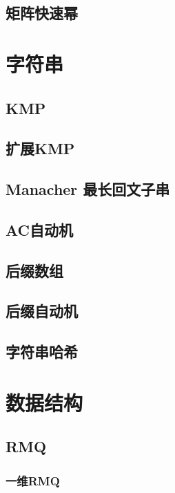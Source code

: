 \documentclass[twocolumn,a4]{article}%
\begin{document}
\subsection{矩阵快速幂}
    
    
\section{字符串}
\subsection{KMP}

\subsection{扩展KMP}

\subsection{Manacher 最长回文子串}

\subsection{AC自动机}

\subsection{后缀数组}

\subsection{后缀自动机}

\subsection{字符串哈希}

\section{数据结构}
\subsection{RMQ}
    \subsubsection{一维RMQ}
    
\end{document}
